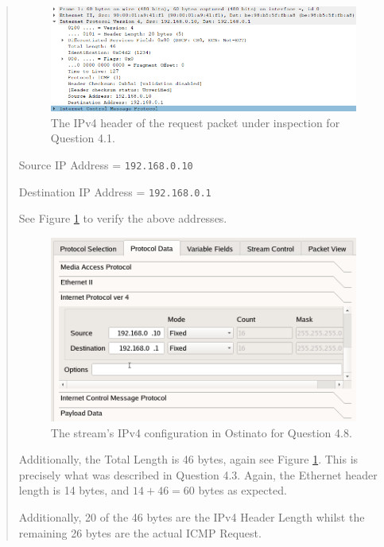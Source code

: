\documentclass{article}
\newenvironment{ans}
{\fbox{Answer}\begin{quote}\nopagebreak}
{\end{quote}}
\begin{document}
\begin{ans}
\begin{figure}[H]
\centering
\includegraphics[width=14cm]{data/q4.8-ip-header.png}
\caption{The IPv4 header of the request packet under
inspection for Question 4.1.}
\label{fig:ip-header-for-q4.8}
\end{figure}

Source IP Address = \texttt{192.168.0.10}

Destination IP Address = \texttt{192.168.0.1}

See Figure \ref{fig:ip-header-for-q4.8} to verify the above
addresses.

\begin{figure}[H]
\centering
\includegraphics[width=14cm]{data/q4.8-stream-config.png}
\caption{The stream's IPv4 configuration in Ostinato for Question 4.8.}
\label{fig:stream-config-for-q4.8}
\end{figure}

Additionally, the Total Length is 46 bytes, again see
Figure \ref{fig:ip-header-for-q4.8}. This is precisely what
was described in Question 4.3. Again, the Ethernet header
length is 14 bytes, and $14 + 46 = 60$ bytes as expected.

Additionally, 20 of the 46 bytes are the IPv4 Header Length
whilst the remaining 26 bytes are the actual ICMP Request.
\end{ans}
\end{document}
